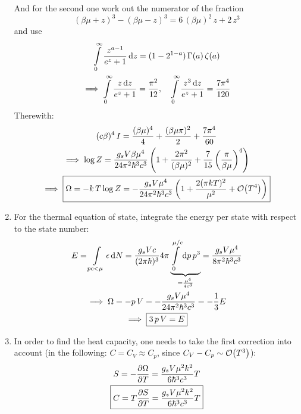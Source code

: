 \documentclass[11pt,a4paper]{scrartcl}
\newcommand{\gs}{g_{s}}
\begin{document}
\begin{enumerate}[label=\textbf{\large(\alph*)}, itemsep=2\baselineskip]
    And for the second one work out the numerator of the fraction
    \begin{equation*}
        (\beta\mu+z)^3-(\beta\mu-z)^3=6\,(\beta\mu)^2\,z+2\,z^3
    \end{equation*}
    and use
    \begin{gather*}
        \int\limits_{0}^{\infty}\frac{z^{a-1}}{e^z+1}\dd{z}=(1-2^{1-a})\,\Gamma(a)\,\zeta(a)
        \\
        \implies\int\limits_{0}^{\infty}\frac{z\dd{z}}{e^z+1}=\frac{\pi^2}{12}
        \qq*{,}
        \int\limits_{0}^{\infty}\frac{z^3\dd{z}}{e^z+1}=\frac{7\pi^4}{120}
    \end{gather*}
    Therewith:
    \begin{gather*}
        (c\beta)^4\,I=\frac{(\beta\mu)^4}{4}+\frac{(\beta\mu\pi)^2}{2}+\frac{7\pi^4}{60}
        \\
        \implies\log{Z}=\frac{\gs{V}\beta\mu^4}{24\pi^2\hbar^3c^3}\left(1+\frac{2\pi^2}{(\beta\mu)^2}+\frac{7}{15}\left(\frac{\pi}{\beta\mu}\right)^4\right)
        \\
        \implies\boxed{%
            \Omega=-k\,T\log{Z}=-\frac{\gs{V}\mu^4}{24\pi^2\hbar^3c^3}\left(1+\frac{2(\pi{k}T)^2}{\mu^2}+\order{T^4}\right)
        }
    \end{gather*}


\item
    For the thermal equation of state, integrate the energy per state with
    respect to the state number:
    \begin{gather*}
        E=\int\limits_{pc<\mu}\epsilon\dd{N}
        =\frac{\gs{V}c}{(2\pi\hbar)^3}4\pi
        \underbrace{%
            \int\limits_{0}^{\mu/c}\dd{p}p^3
        }_{=\frac{\mu^4}{4c^3}}
        =\frac{\gs{V}\mu^4}{8\pi^2\hbar^3c^3} \\
        \implies\Omega=-p\,V=-\frac{\gs{V}\mu^4}{24\pi^2\hbar^3c^3}=-\frac{1}{3}E
        \\
        \implies\boxed{3\,p\,V=E}
    \end{gather*}


\item
    In order to find the heat capacity, one needs to take the first correction
    into account (in the following: $C=C_V\approx C_p$, since
    $C_V-C_p\sim\order{T^3}$):
    \begin{gather*}
        S=-\pdv{\Omega}{T}=\frac{\gs{V}\mu^2k^2}{6\hbar^3c^3}T \\
        \boxed{C=T\pdv{S}{T}=\frac{\gs{V}\mu^2k^2}{6\hbar^3c^3}T}
    \end{gather*}

\end{enumerate}
\end{document}
